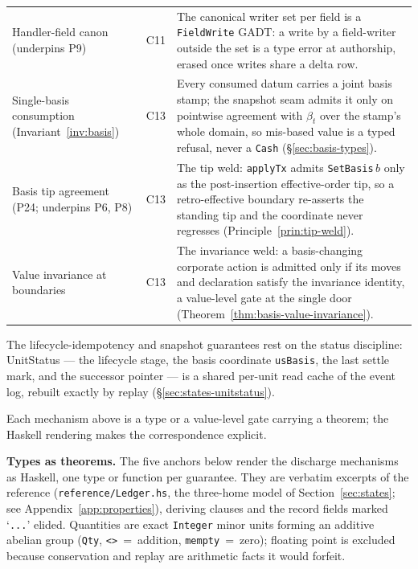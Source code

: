 \documentclass[11pt,a4paper]{article}
\begin{document}
\begin{center}
\begin{longtable}{@{}p{3.5cm}p{1.6cm}p{6.4cm}@{}}
Handler-field canon (underpins P9) & C11 & The canonical writer set per field is a \texttt{FieldWrite} GADT: a write by a field-writer outside the set is a type error at authorship, erased once writes share a delta row. \\
Single-basis consumption (Invariant~\ref{inv:basis}) & C13 & Every consumed datum carries a joint basis stamp; the snapshot seam admits it only on pointwise agreement with $\beta_t$ over the stamp's whole domain, so mis-based value is a typed refusal, never a \texttt{Cash} (\S\ref{sec:basis-types}). \\
Basis tip agreement (P24; underpins P6, P8) & C13 & The tip weld: \texttt{applyTx} admits \texttt{SetBasis}\,$b$ only as the post-insertion effective-order tip, so a retro-effective boundary re-asserts the standing tip and the coordinate never regresses (Principle~\ref{prin:tip-weld}). \\
Value invariance at boundaries & C13 & The invariance weld: a basis-changing corporate action is admitted only if its moves and declaration satisfy the invariance identity, a value-level gate at the single door (Theorem~\ref{thm:basis-value-invariance}). \\
\bottomrule
\end{longtable}
\end{center}

The lifecycle-idempotency and snapshot guarantees rest on the status discipline: UnitStatus --- the lifecycle stage, the basis coordinate \texttt{usBasis}, the last settle mark, and the successor pointer --- is a shared per-unit read cache of the event log, rebuilt exactly by replay (\S\ref{sec:states-unitstatus}).

Each mechanism above is a type or a value-level gate carrying a theorem; the Haskell rendering makes the correspondence explicit.

\noindent\textbf{Types as theorems.} The five anchors below render the discharge mechanisms as Haskell, one type or function per guarantee. They are verbatim excerpts of the reference (\texttt{reference/Ledger.hs}, the three-home model of Section~\ref{sec:states}; see Appendix~\ref{app:properties}), deriving clauses and the record fields marked `\texttt{...}' elided. Quantities are exact \texttt{Integer} minor units forming an additive abelian group (\texttt{Qty}, \texttt{<>}~=~addition, \texttt{mempty}~=~zero); floating point is excluded because conservation and replay are arithmetic facts it would forfeit.
\end{document}
